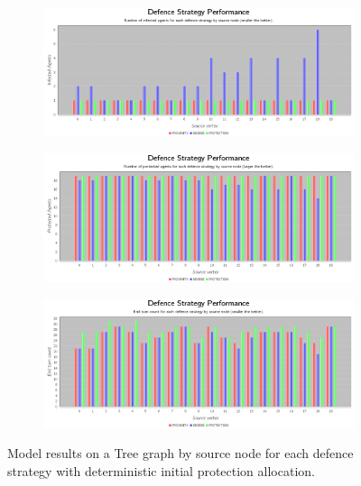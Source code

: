 \documentclass[results.tex]{subfiles}
\begin{document}
\begin{figure}[!ht]
\centering
     \begin{subfigure}[b]{0.9\textwidth}
         \centering
         \includegraphics[width=\textwidth]{Tree/Deterministic/DeterministicInfectedChart}
         \label{fig:tree-det-infected}
     \end{subfigure}
     \vfill
     \begin{subfigure}[b]{0.9\textwidth}
         \centering
         \includegraphics[width=\textwidth]{Tree/Deterministic/DeterministicProtectedChart}
         \label{fig:tree-det-protected}
     \end{subfigure}
     \vfill
     \begin{subfigure}[b]{0.9\textwidth}
         \centering
         \includegraphics[width=\textwidth]{Tree/Deterministic/DeterministicEndTurnChart}
         \label{fig:tree-det-end}
     \end{subfigure}
        \caption{Model results on a Tree graph by source node for each defence strategy with deterministic initial protection allocation.}
        \label{fig:tree-det-charts}
\end{figure}
\end{document}
